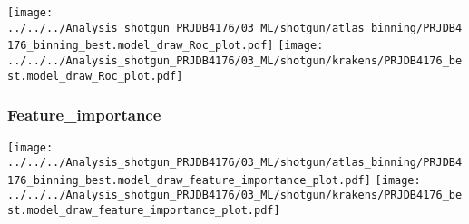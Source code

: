 \documentclass[
]{article}
\begin{document}
\texttt{[image: ../../../Analysis\_shotgun\_PRJDB4176/03\_ML/shotgun/atlas\_binning/PRJDB4176\_binning\_best.model\_draw\_Roc\_plot.pdf]}
\texttt{[image: ../../../Analysis\_shotgun\_PRJDB4176/03\_ML/shotgun/krakens/PRJDB4176\_best.model\_draw\_Roc\_plot.pdf]}

\hypertarget{feature_importance-1}{%
\subsubsection{Feature\_importance}\label{feature_importance-1}}

\texttt{[image: ../../../Analysis\_shotgun\_PRJDB4176/03\_ML/shotgun/atlas\_binning/PRJDB4176\_binning\_best.model\_draw\_feature\_importance\_plot.pdf]}
\texttt{[image: ../../../Analysis\_shotgun\_PRJDB4176/03\_ML/shotgun/krakens/PRJDB4176\_best.model\_draw\_feature\_importance\_plot.pdf]}
\end{document}
